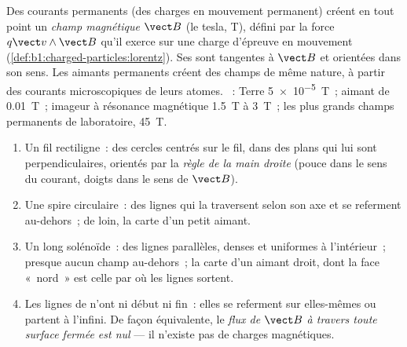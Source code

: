 \begin{definition}\label{def:b1:magnetostatics:field}
Des courants permanents (des charges en mouvement permanent) créent en tout
point un \emph{champ magnétique} $\vect B$ (le tesla, \unit{T}), défini par la
force $q\vect v\wedge\vect B$ qu'il exerce sur une charge d'épreuve en
mouvement (\cref{def:b1:charged-particles:lorentz}). Ses \emph{}
sont tangentes à $\vect B$ et orientées dans son sens. Les aimants permanents
créent des champs de même nature, à partir des courants microscopiques de
leurs atomes. ~: Terre \qty{5e-5}{T}~; aimant de
 \qty{0.01}{T}~; imageur à résonance magnétique \qty{1.5}{T} à
\qty{3}{T}~; les plus grands champs permanents de laboratoire, \qty{45}{T}.
\end{definition}

\begin{proposition}\label{prop:b1:magnetostatics:maps}
\begin{enumerate}
  \item Un fil rectiligne~: des cercles centrés sur le fil, dans des plans
        qui lui sont perpendiculaires, orientés par la \emph{règle de la main
        droite} (pouce dans le sens du courant, doigts dans le sens de $\vect B$).
  \item Une spire circulaire~: des lignes qui la traversent selon son axe et
        se referment au-dehors~; de loin, la carte d'un petit aimant.
  \item Un long solénoïde~: des lignes parallèles, denses et uniformes à
        l'intérieur~; presque aucun champ au-dehors~; la carte d'un aimant
        droit, dont la face «~nord~» est celle par où les lignes sortent.
  \item Les lignes de  n'ont ni début ni fin~: elles se
        referment sur elles-mêmes ou partent à l'infini. De façon équivalente,
        le \emph{flux de $\vect B$ à travers toute surface fermée est nul}
        --- il n'existe pas de charges magnétiques.
\end{enumerate}
\end{proposition}
\admitted

